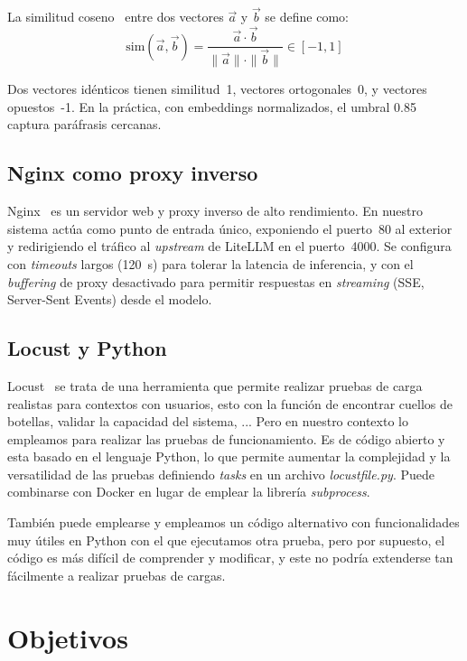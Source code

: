 La similitud coseno~\cite{cosineSim} entre dos vectores $\vec{a}$ y $\vec{b}$ se define como:
\begin{equation}
    \text{sim}(\vec{a}, \vec{b}) = \frac{\vec{a} \cdot \vec{b}}{\|\vec{a}\| \cdot \|\vec{b}\|} \in [-1, 1]
\end{equation}

Dos vectores idénticos tienen similitud~1, vectores ortogonales~0, y vectores opuestos~{-1}. En la práctica, con embeddings normalizados, el umbral 0.85 captura paráfrasis cercanas.%

\subsection{Nginx como proxy inverso}

Nginx~\cite{nginx} es un servidor web y proxy inverso de alto rendimiento. En nuestro sistema actúa como punto de entrada único, exponiendo el puerto~80 al exterior y redirigiendo el tráfico al \textit{upstream} de LiteLLM en el puerto~4000. Se configura con \textit{timeouts} largos (120~s) para tolerar la latencia de inferencia, y con el \textit{buffering} de proxy desactivado para permitir respuestas en \textit{streaming} (SSE, Server-Sent Events) desde el modelo.

\subsection{Locust y Python}

Locust~\cite{locust} se trata de una herramienta que permite realizar pruebas de carga realistas para contextos con usuarios, esto con la función de encontrar cuellos de botellas, validar la capacidad del sistema, ... Pero en nuestro contexto lo empleamos para realizar las pruebas de funcionamiento. Es de código abierto y esta basado en el lenguaje Python, lo que permite aumentar la complejidad y la versatilidad de las pruebas definiendo \emph{tasks} en un archivo \emph{locustfile.py}. Puede combinarse con Docker en lugar de emplear la librería \emph{subprocess}.

También puede emplearse y empleamos un código alternativo con funcionalidades muy útiles en Python con el que ejecutamos otra prueba, pero por supuesto, el código es más difícil de comprender y modificar, y este no podría extenderse tan fácilmente a realizar pruebas de cargas.

\section{Objetivos}

